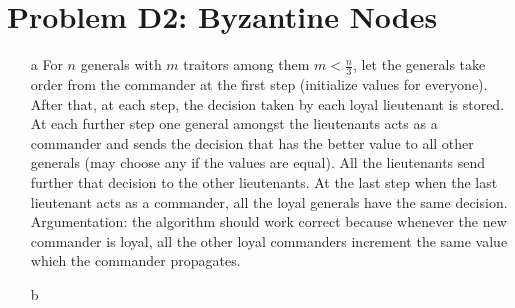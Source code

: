 \documentclass[]{article}
\begin{document}
\section{Problem D2: Byzantine Nodes}
\begin{itemize}
	\item [a] For $n$ generals with $m$ traitors among them $ m < \frac{n}{3}$, let the generals take order from the commander at the first step (initialize values for everyone). After that, at each step, the decision taken by each loyal lieutenant is stored. At each further step one general amongst the lieutenants acts as a commander and sends the decision that has the better value to all other generals (may choose any if the values are equal). All the lieutenants send further that decision to the other lieutenants. At the last step when the last lieutenant acts as a commander, all the loyal generals have the same decision. Argumentation: the algorithm should work correct  because whenever the new commander is loyal, all the other loyal commanders increment the same value which the commander propagates.
	\item [b]
\end{itemize}
\end{document}
